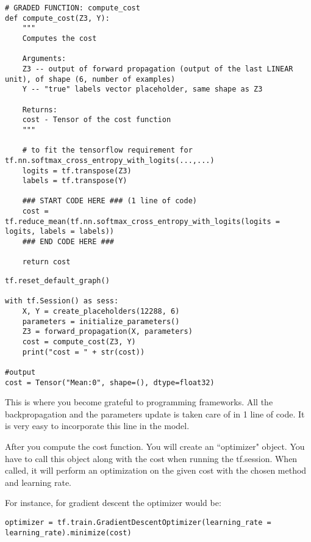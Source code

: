 \begin{verbatim}
# GRADED FUNCTION: compute_cost 
def compute_cost(Z3, Y):
    """
    Computes the cost
    
    Arguments:
    Z3 -- output of forward propagation (output of the last LINEAR unit), of shape (6, number of examples)
    Y -- "true" labels vector placeholder, same shape as Z3
    
    Returns:
    cost - Tensor of the cost function
    """
    
    # to fit the tensorflow requirement for tf.nn.softmax_cross_entropy_with_logits(...,...)
    logits = tf.transpose(Z3)
    labels = tf.transpose(Y)
    
    ### START CODE HERE ### (1 line of code)
    cost = tf.reduce_mean(tf.nn.softmax_cross_entropy_with_logits(logits = logits, labels = labels))
    ### END CODE HERE ###
    
    return cost
\end{verbatim} 

\begin{verbatim}
tf.reset_default_graph()

with tf.Session() as sess:
    X, Y = create_placeholders(12288, 6)
    parameters = initialize_parameters()
    Z3 = forward_propagation(X, parameters)
    cost = compute_cost(Z3, Y)
    print("cost = " + str(cost))
     
#output    
cost = Tensor("Mean:0", shape=(), dtype=float32)
\end{verbatim}     




This is where you become grateful to programming frameworks. All the backpropagation and the parameters update is taken care of in 1 line of code. It is very easy to incorporate this line in the model.

After you compute the cost function. You will create an ``optimizer" object. You have to call this object along with the cost when running the tf.session. When called, it will perform an optimization on the given cost with the chosen method and learning rate.

For instance, for gradient descent the optimizer would be:
\begin{verbatim}
optimizer = tf.train.GradientDescentOptimizer(learning_rate = learning_rate).minimize(cost)
\end{verbatim}  

